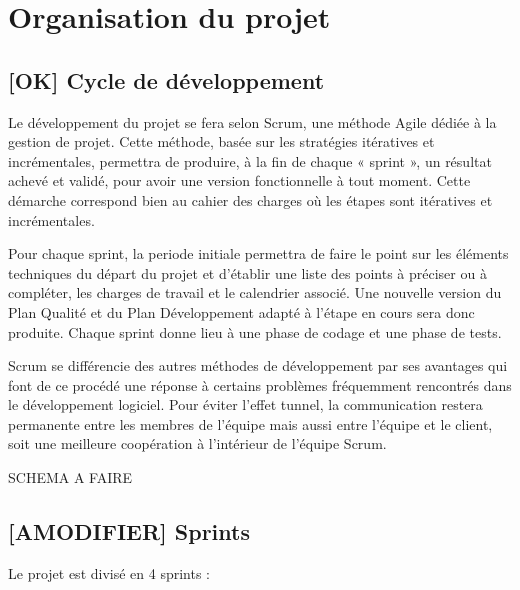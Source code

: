 \documentclass[10pt,a4paper]{article}
\begin{document}

\section{Organisation du projet}
\label{sec:organisation}

\subsection{[OK] Cycle de développement}

Le développement du projet se fera selon Scrum, une méthode Agile dédiée à la gestion de projet. Cette méthode, basée sur les stratégies itératives et incrémentales, permettra de produire, à la fin de chaque « sprint », un résultat achevé et validé, pour avoir une version fonctionnelle à tout moment. Cette démarche correspond bien au cahier des charges où les étapes sont itératives et incrémentales.

Pour chaque sprint, la periode initiale permettra de faire le point sur les éléments techniques du départ du projet et d'établir une liste des points à préciser ou à compléter, les charges de travail et le calendrier associé. Une nouvelle version du Plan Qualité et du Plan Développement adapté à l'étape en cours sera donc produite. Chaque sprint donne lieu à une phase de codage et une phase de tests.

Scrum se différencie des autres méthodes de développement par ses avantages qui font de ce procédé une réponse à certains problèmes fréquemment rencontrés dans le développement logiciel. Pour éviter l’effet tunnel, la communication restera permanente entre les membres de l’équipe mais aussi entre l’équipe et le client, soit une meilleure coopération à l’intérieur de l’équipe Scrum. 

SCHEMA A FAIRE

\subsection{[AMODIFIER] Sprints}

\noindent Le projet est divisé en 4 sprints : 
\end{document}
